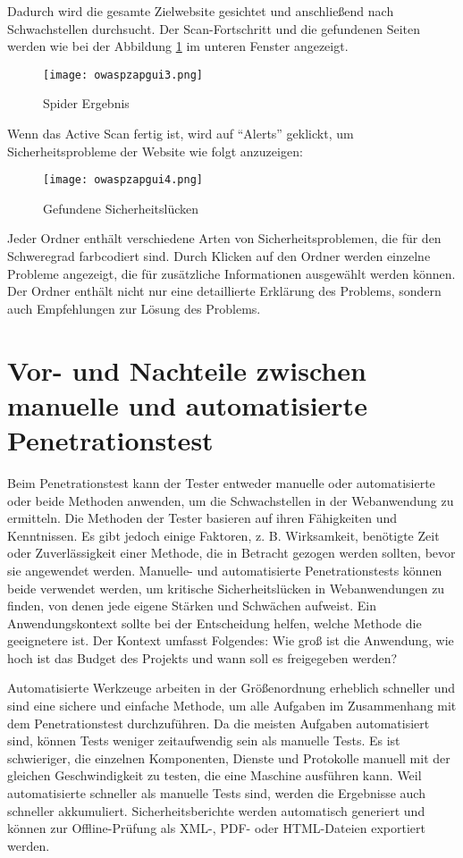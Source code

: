 Dadurch wird die gesamte Zielwebsite gesichtet und anschließend nach Schwachstellen durchsucht. Der Scan-Fortschritt und die gefundenen Seiten werden wie bei der Abbildung \ref{quickscan3} im unteren Fenster angezeigt.

\newpage

\begin{figure}[h]
	\centering
	\texttt{[image: owaspzapgui3.png]}
	\caption{Spider Ergebnis}
	\label{quickscan3}
\end{figure}

Wenn das Active Scan fertig ist, wird auf "`Alerts"' geklickt, um Sicherheitsprobleme der Website wie folgt anzuzeigen:

\begin{figure}[h]
	\centering
	\texttt{[image: owaspzapgui4.png]}
	\caption{Gefundene Sicherheitslücken}
	\label{quickscan4}
\end{figure}

Jeder Ordner enthält verschiedene Arten von Sicherheitsproblemen, die für den Schweregrad farbcodiert sind. Durch Klicken auf den Ordner werden einzelne Probleme angezeigt, die für zusätzliche Informationen ausgewählt werden können. Der Ordner enthält nicht nur eine detaillierte Erklärung des Problems, sondern auch Empfehlungen zur Lösung des Problems.

\section{Vor- und Nachteile zwischen manuelle und automatisierte Penetrationstest}

Beim Penetrationstest kann der Tester entweder manuelle oder automatisierte oder beide Methoden anwenden, um die Schwachstellen in der Webanwendung zu ermitteln. Die Methoden der Tester basieren auf ihren Fähigkeiten und Kenntnissen. Es gibt jedoch einige Faktoren, z. B. Wirksamkeit, benötigte Zeit oder Zuverlässigkeit einer Methode, die in Betracht gezogen werden sollten, bevor sie angewendet werden. Manuelle- und automatisierte Penetrationstests können beide verwendet werden, um kritische Sicherheitslücken in Webanwendungen zu finden, von denen jede eigene Stärken und Schwächen aufweist. Ein Anwendungskontext sollte bei der Entscheidung helfen, welche Methode die geeignetere ist. Der Kontext umfasst Folgendes: Wie groß ist die Anwendung, wie hoch ist das Budget des Projekts und wann soll es freigegeben werden?

Automatisierte Werkzeuge arbeiten in der Größenordnung erheblich schneller und sind eine sichere und einfache Methode, um alle Aufgaben im Zusammenhang mit dem Penetrationstest durchzuführen. Da die meisten Aufgaben automatisiert sind, können Tests weniger zeitaufwendig sein als manuelle Tests. Es ist schwieriger, die einzelnen Komponenten, Dienste und Protokolle manuell mit der gleichen Geschwindigkeit zu testen, die eine Maschine ausführen kann. Weil automatisierte schneller als manuelle Tests sind, werden die Ergebnisse auch schneller akkumuliert. Sicherheitsberichte werden automatisch generiert und können zur Offline-Prüfung als XML-, PDF- oder HTML-Dateien exportiert werden\cite{autovorteil99}.

